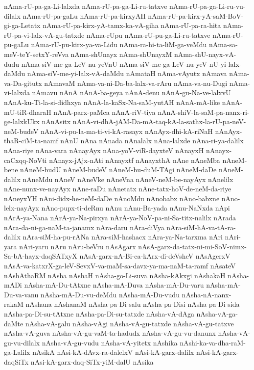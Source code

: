 {nAma-rU-pa-ga-Li-lalxda
nAma-rU-pa-ga-Li-ru-tatxve
nAma-rU-pa-ga-Li-ru-vu-dilalx
nAma-rU-pa-gaLu
nAma-rU-pa-kirxyAH
nAma-rU-pa-kirx-yA-saM-BoV-gi-ga-Letatx
nAma-rU-pa-kirx-yA-tamx-ka-vA-giha
nAma-rU-pa-ra-hita
nAma-rU-pa-vi-lalx-vA-gu-tatxde
nAma-rUpu
nAma-rU-pu-ga-Li-ru-tatxve
nAma-rU-pu-gaLu
nAma-rU-pu-kirx-ya-va-Lidu
nAma-ra-hi-ta-liM-ga-veMdu
nAma-sa-meV-teY-setxY-reVva
nAma-shUnayx
nAma-shUnayxM
nAma-shU-nayx-vA-dudu
nAma-siV-me-ga-LeV-nu-yeVnU
nAma-siV-me-ga-LeV-nu-yeV-nU-yi-lalx-daMdu
nAma-siV-me-yi-lalx-vA-daMdu
nAmataH
nAma-vAyutx
nAmava
nAma-va-Da-gitutx
nAmavaM
nAma-va-ni-Da-ba-lalx-va-rAru
nAma-va-nu-Dugi
nAma-vi-lalxda
nAmavu
nAnA
nAnA-ba-geya
nAnA-denu
nAnA-gu-Na-ve-lalxvU
nAnA-ku-Ti-la-si-didhxya
nAnA-la-kaSx-Na-saM-yutAH
nAnA-mA-like
nAnA-mU-tiR-dharaH
nAnA-parx-paMca
nAnA-riV-tiya
nAnA-shiV-la-saM-pa-nanx-ri-ge-lalxkUkx
nAnAsitx
nAnA-vi-dhA-jAM-Da-mA-taq-kA-la-sathx-la-rU-pa-neV-neM-budeV
nAnA-vi-pu-la-ma-ti-vi-kA-rasayx
nAnAyx-dhi-kA-riNaH
nAnAyx-thaR-ciM-ta-namf
nAnU
nAna
nAnada
nAnalalx
nAna-lalxde
nAna-ri-ya-dalilx
nAna-riye
nAna-vara
nAnayAyx
nAna-yoV-viR-dayxteV
nAnayxH
nAnayx-caCxqq-NoVti
nAnayx-jAjx-nAti
nAnayxtf
nAnayxthA
nAne
nAneMba
nAneM-bene
nAneM-budU
nAneM-budeV
nAneM-bu-duM-TAgi
nAneM-daDe
nAneM-dalilx
nAneMdu
nAneV
nAneVke
nAneVna
nAneV-neM-be-nayAyx
nAnelilx
nAne-nunx-ve-nayAyx
nAne-raDu
nAnetatx
nAne-tatx-hoV-de-neM-da-riye
nAneyxYH
nAni-didx-he-neM-daDe
nAnoMdu
nAnobabx
nAno-babxne
nAno-lelx-nayAyx
nAno-pupx-ti-deRnu
nAnu
nAnu-Ba-yada
nAnu-NaNxda
nApi
nArA-ya-Nana
nArA-ya-Na-pirxya
nArA-ya-NoV-pa-ni-Sa-titx-nalilx
nArada
nAra-da-ni-ga-naM-ta-janamx
nAra-daru
nAra-diVya
nAra-siM-hA-va-tA-ra-dalilx
nAra-siM-ha-pu-rANa
nAra-siM-hashacx
nAra-ya-Na-tarxma
nAri
nAri-yara
nAri-yaru
nAru
nAru-beVru
nAsAgarx
nAsA-garx-da-tatx-ni-mi-SoV-nimx-Sa-bA-hayx-daqSATxyX
nAsA-garx-nA-Bi-ca-kArx-di-deVsheV
nAsAgerxV
nAsA-va-katxrX-ga-leV-SevxV-va-maM-sa-davx-ya-ma-naM-ta-ramf
nAsateV
nAshAthaRM
nAsha
nAshaH
nAsha-go-Li-suva
nAsha-kAkxgi
nAshakaH
nAsha-mADi
nAsha-mA-Du-tAtxne
nAsha-mA-Duva
nAsha-mA-Du-varu
nAsha-mA-Du-va-vanu
nAsha-mA-Du-vu-deMdu
nAsha-mA-Du-vudu
nAsha-nA-nanx-rakaM
nAshana
nAshanaM
nAsha-pa-Di-salu
nAsha-pa-Disi
nAsha-pa-Di-sida
nAsha-pa-Di-su-tAtxne
nAsha-pa-Di-su-tatxde
nAsha-vA-dAga
nAsha-vA-ga-daMte
nAsha-vA-galu
nAsha-vAgi
nAsha-vA-gu-tatxde
nAsha-vA-gu-tatxve
nAsha-vA-guva
nAsha-vA-gu-vaM-ta-hadudx
nAsha-vA-gu-vu-danunx
nAsha-vA-gu-vu-dilalx
nAsha-vA-gu-vudu
nAsha-vA-yitetx
nAshika
nAshi-ka-va-dha-raM-ga-Lalilx
nAsikA
nAsi-kA-dAvx-ra-dalelxV
nAsi-kA-garx-dalilx
nAsi-kA-garx-daqSiTx
nAsi-kA-garx-daq-SiTx-yiM-dalU
nAsika
}
